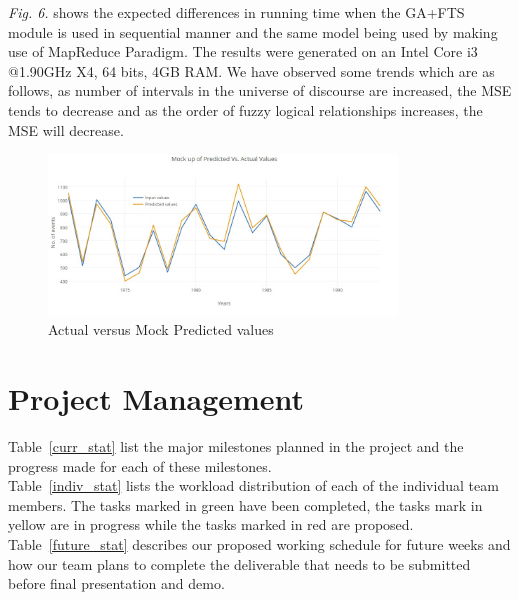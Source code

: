 \documentclass[12pt,journal,compsoc]{IEEEtran}
\begin{document}
\emph{Fig. 6.} shows the expected differences in running time when the GA+FTS module is used in sequential manner and the same model being used by making use of MapReduce Paradigm. The results were generated on an Intel Core i3 @1.90GHz X4, 64 bits, 4GB RAM.
We have observed some trends which are as follows, as number of intervals in the universe of discourse are increased, the MSE tends to decrease and as the order of fuzzy logical relationships increases, the MSE will decrease.

\begin{figure}
\includegraphics[width=3.65in]{predvsact}
\caption{Actual versus Mock Predicted values}
\end{figure}

\section{Project Management}
Table~\ref{curr_stat} list the major milestones planned in the project and the progress made for each of these milestones.\\
\indent Table~\ref{indiv_stat} lists the workload distribution of each of the individual team members. The tasks marked in green have been completed, the tasks mark in yellow are in progress while the tasks marked in red are proposed.\\ 
 \indent Table~\ref{future_stat}  describes our proposed working schedule for future weeks and how our team plans to complete the deliverable that needs to be submitted before final presentation and demo.
\end{document}
